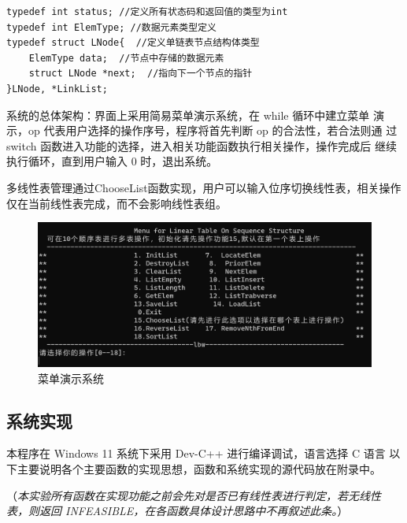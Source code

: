 \documentclass[supercite]{Experimental_Report}
\theoremstyle{definition}
\begin{document}
\begin{lstlisting}[title = 相关数据结构定义,frame=none]
typedef int status; //定义所有状态码和返回值的类型为int
typedef int ElemType; //数据元素类型定义
typedef struct LNode{  //定义单链表节点结构体类型
	ElemType data;  //节点中存储的数据元素
	struct LNode *next;  //指向下一个节点的指针
}LNode, *LinkList;

\end{lstlisting}

系统的总体架构：界面上采用简易菜单演示系统，在 while 循环中建立菜单
演示，op 代表用户选择的操作序号，程序将首先判断 op 的合法性，若合法则通
过 switch 函数进入功能的选择，进入相关功能函数执行相关操作，操作完成后
继续执行循环，直到用户输入 0 时，退出系统。

多线性表管理通过ChooseList函数实现，用户可以输入位序切换线性表，相关操作仅在当前线性表完成，而不会影响线性表组。
\begin{figure}[htbp]
	\centering
	\begin{minipage}{0.7\linewidth}
		\centering
		\includegraphics[width=0.9\linewidth]{images/菜单设计.png}
	\end{minipage}
	\caption{菜单演示系统}
	\label{fig1-1}
\end{figure}
\subsection{系统实现}
本程序在 Windows 11 系统下采用 Dev-C++ 进行编译调试，语言选择 C 语言
以下主要说明各个主要函数的实现思想，函数和系统实现的源代码放在附录中。

（\emph{本实验所有函数在实现功能之前会先对是否已有线性表进行判定，若无线性
表，则返回 INFEASIBLE，在各函数具体设计思路中不再叙述此条。}）
\end{document}
